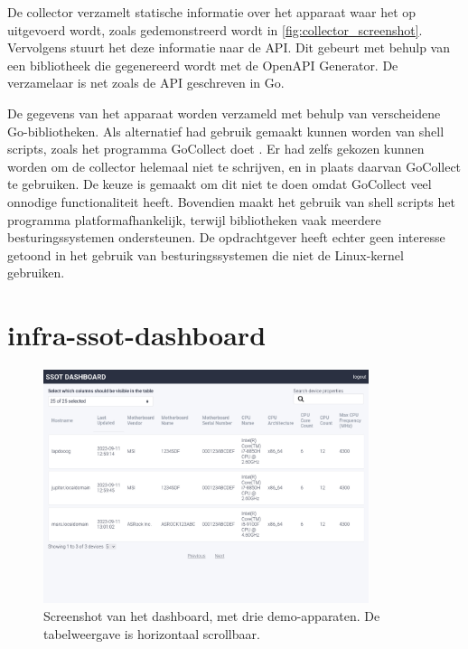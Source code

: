\documentclass[../report.tex]{subfiles}
\begin{document}
De collector verzamelt statische informatie over het apparaat waar het op uitgevoerd wordt, zoals gedemonstreerd wordt in \autoref{fig:collector_screenshot}. Vervolgens stuurt het deze informatie naar de \gls*{API}. Dit gebeurt met behulp van een bibliotheek die gegenereerd wordt met de \gls*{OpenAPI} Generator. De verzamelaar is net zoals de \gls*{API} geschreven in \gls*{Go}.

De gegevens van het apparaat worden verzameld met behulp van verscheidene \gls*{Go}-bibliotheken. Als alternatief had gebruik gemaakt kunnen worden van shell scripts, zoals het programma GoCollect doet \parencite{gocollect}. Er had zelfs gekozen kunnen worden om de collector helemaal niet te schrijven, en in plaats daarvan GoCollect te gebruiken. De keuze is gemaakt om dit niet te doen omdat GoCollect veel onnodige functionaliteit heeft. Bovendien maakt het gebruik van shell scripts het programma platformafhankelijk, terwijl bibliotheken vaak meerdere besturingssystemen ondersteunen. De opdrachtgever heeft echter geen interesse getoond in het gebruik van besturingssystemen die niet de Linux-kernel gebruiken.

\section{infra-ssot-dashboard}

\begin{figure}[ht]
  \centering
  \includegraphics[width=0.85\textwidth]{assets/images/infra-ssot-dashboard-table.png}
  \caption{Screenshot van het dashboard, met drie demo-apparaten. De tabelweergave is horizontaal scrollbaar.}
  \label{fig:dashboard_screenshot_table}
\end{figure}
\end{document}
